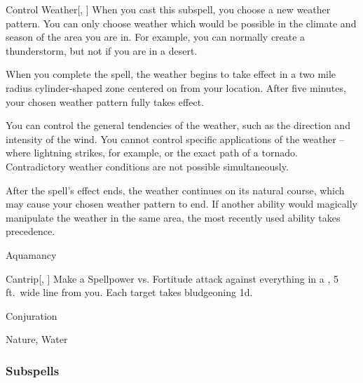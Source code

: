 \begin{ability}[\nth{7}]{Control Weather}[, ]
When you cast this subspell, you choose a new weather pattern.
You can only choose weather which would be possible in the climate and season of the area you are in.
For example, you can normally create a thunderstorm, but not if you are in a desert.

When you complete the spell, the weather begins to take effect in a two mile radius cylinder-shaped zone centered on from your location.
After five minutes, your chosen weather pattern fully takes effect.

You can control the general tendencies of the weather, such as the direction and intensity of the wind.
You cannot control specific applications of the weather -- where lightning strikes, for example, or the exact path of a tornado.
Contradictory weather conditions are not possible simultaneously.

After the spell's effect ends, the weather continues on its natural course, which may cause your chosen weather pattern to end.
If another ability would magically manipulate the weather in the same area, the most recently used ability takes precedence.
\end{ability}
\vspace{0.25em}

\newpage
\begin{spellsection}{Aquamancy}

\begin{spellheader}
\end{spellheader}


\begin{ability}{Cantrip}[, ]
Make a Spellpower vs. Fortitude attack against everything in a \areamed, 5 ft.\ wide line from you.
\hit Each target takes bludgeoning  \minus1d.
\end{ability}




 Conjuration

 Nature, Water
\end{spellsection}


\subsubsection{Subspells}



